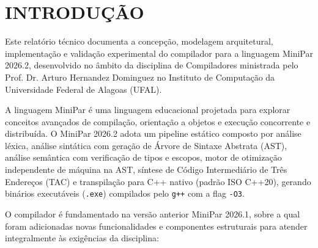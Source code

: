 \chapter{INTRODUÇÃO}

Este relatório técnico documenta a concepção, modelagem arquitetural, implementação e validação experimental do compilador para a linguagem MiniPar 2026.2, desenvolvido no âmbito da disciplina de Compiladores ministrada pelo Prof. Dr. Arturo Hernandez Dominguez no Instituto de Computação da Universidade Federal de Alagoas (UFAL).

A linguagem MiniPar é uma linguagem educacional projetada para explorar conceitos avançados de compilação, orientação a objetos e execução concorrente e distribuída. O MiniPar 2026.2 adota um pipeline estático composto por análise léxica, análise sintática com geração de Árvore de Sintaxe Abstrata (AST), análise semântica com verificação de tipos e escopos, motor de otimização independente de máquina na AST, síntese de Código Intermediário de Três Endereços (TAC) e transpilação para C++ nativo (padrão ISO C++20), gerando binários executáveis (\texttt{.exe}) compilados pelo \texttt{g++} com a flag \texttt{-O3}.

O compilador é fundamentado na versão anterior MiniPar 2026.1, sobre a qual foram adicionadas novas funcionalidades e componentes estruturais para atender integralmente às exigências da disciplina:

